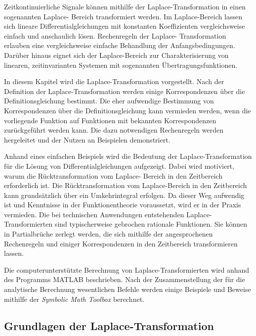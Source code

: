\noindent Zeitkontinuierliche Signale können mithilfe der Laplace-Transformation in einen sogenannten Laplace-
Bereich transformiert werden. Im Laplace-Bereich lassen sich lineare Differentialgleichungen mit konstanten Koeffizienten vergleichsweise einfach und anschaulich lösen. Rechenregeln der Laplace- Transformation erlauben eine vergleichsweise einfache Behandlung der Anfangsbedingungen. Darüber hinaus eignet sich der Laplace-Bereich zur Charakterisierung von linearen, zeitinvarianten Systemen mit sogenannten Übertragungsfunktionen.\newline

\noindent In diesem Kapitel wird die Laplace-Transformation vorgestellt. Nach der Definition der Laplace-Transformation werden einige Korrespondenzen über die Definitionsgleichung bestimmt. Die eher aufwendige Bestimmung von Korrespondenzen über die Definitionsgleichung kann vermieden werden, wenn die vorliegende Funktion auf Funktionen mit bekannten Korrespondenzen zurückgeführt werden kann. Die dazu notwendigen Rechenregeln werden hergeleitet und der Nutzen an Beispielen demonstriert.\newline

\noindent Anhand eines einfachen Beispiels wird die Bedeutung der Laplace-Transformation für die Lösung von
Differentialgleichungen aufgezeigt. Dabei wird motiviert, warum die Rücktransformation vom Laplace- Bereich in den Zeitbereich erforderlich ist. Die Rücktransformation vom Laplace-Bereich in den Zeitbereich kann grundsätzlich über ein Umkehrintegral erfolgen. Da dieser Weg aufwendig ist und Kenntnisse in der Funktionentheorie voraussetzt, wird er in der Praxis vermieden. Die bei technischen
Anwendungen entstehenden Laplace-Transformierten sind typischerweise gebrochen rationale Funktionen. Sie können in Partialbrüche zerlegt werden, die sich mithilfe der angesprochenen Rechenregeln und einiger Korrespondenzen in den Zeitbereich transformieren lassen.\newline

\noindent Die computerunterstützte Berechnung von Laplace-Transformierten wird anhand des Programms MATLAB beschrieben. Nach der Zusammenstellung der für die analytische Berechnung wesentlichen Befehle werden einige Beispiele und Beweise mithilfe der \textit{Symbolic Math Toolbox} berechnet.

\subsection{Grundlagen der Laplace-Transformation}

